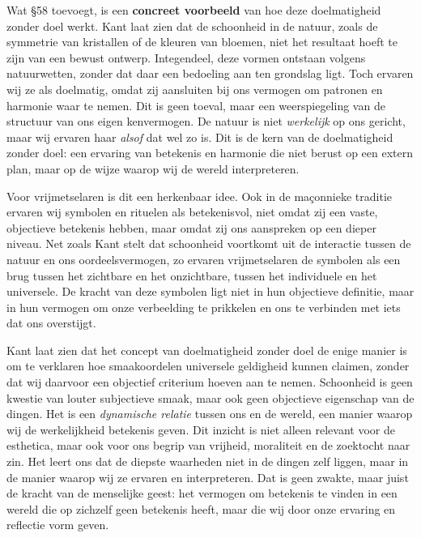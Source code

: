 \begin{mdframed}[leftmargin=0pt,rightmargin=0pt,backgroundcolor=blue!6,linecolor=white,innertopmargin=6pt,innerbottommargin=6pt]
Wat §58 toevoegt, is een \textbf{concreet voorbeeld} van hoe deze doelmatigheid zonder doel werkt. Kant laat zien dat de schoonheid in de natuur, zoals de symmetrie van kristallen of de kleuren van bloemen, niet het resultaat hoeft te zijn van een bewust ontwerp. Integendeel, deze vormen ontstaan volgens natuurwetten, zonder dat daar een bedoeling aan ten grondslag ligt. Toch ervaren wij ze als doelmatig, omdat zij aansluiten bij ons vermogen om patronen en harmonie waar te nemen. Dit is geen toeval, maar een weerspiegeling van de structuur van ons eigen kenvermogen. De natuur is niet \textit{werkelijk} op ons gericht, maar wij ervaren haar \textit{alsof} dat wel zo is. Dit is de kern van de doelmatigheid zonder doel: een ervaring van betekenis en harmonie die niet berust op een extern plan, maar op de wijze waarop wij de wereld interpreteren.

Voor vrijmetselaren is dit een herkenbaar idee. Ook in de maçonnieke traditie ervaren wij symbolen en rituelen als betekenisvol, niet omdat zij een vaste, objectieve betekenis hebben, maar omdat zij ons aanspreken op een dieper niveau. Net zoals Kant stelt dat schoonheid voortkomt uit de interactie tussen de natuur en ons oordeelsvermogen, zo ervaren vrijmetselaren de symbolen als een brug tussen het zichtbare en het onzichtbare, tussen het individuele en het universele. De kracht van deze symbolen ligt niet in hun objectieve definitie, maar in hun vermogen om onze verbeelding te prikkelen en ons te verbinden met iets dat ons overstijgt.

Kant laat zien dat het concept van doelmatigheid zonder doel de enige manier is om te verklaren hoe smaakoordelen universele geldigheid kunnen claimen, zonder dat wij daarvoor een objectief criterium hoeven aan te nemen. Schoonheid is geen kwestie van louter subjectieve smaak, maar ook geen objectieve eigenschap van de dingen. Het is een \textit{dynamische relatie} tussen ons en de wereld, een manier waarop wij de werkelijkheid betekenis geven. Dit inzicht is niet alleen relevant voor de esthetica, maar ook voor ons begrip van vrijheid, moraliteit en de zoektocht naar zin. Het leert ons dat de diepste waarheden niet in de dingen zelf liggen, maar in de manier waarop wij ze ervaren en interpreteren. Dat is geen zwakte, maar juist de kracht van de menselijke geest: het vermogen om betekenis te vinden in een wereld die op zichzelf geen betekenis heeft, maar die wij door onze ervaring en reflectie vorm geven.

\end{mdframed}

